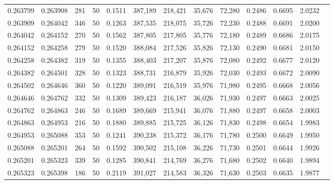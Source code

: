\begin{tabular}{rrrrrrrrrrrrr}
0.263799 & 0.263908 &   281 &  50 &                                     0.1511 & 387,189 & 218,421 &  35,676 &  72,280 & 0.2486 & 0.6695 & 2.0232 \\
0.263909 & 0.264042 &   346 &  50 &                                     0.1263 & 387,535 & 218,075 &  35,726 &  72,230 & 0.2488 & 0.6691 & 2.0200 \\
0.264042 & 0.264152 &   270 &  50 &                                     0.1562 & 387,805 & 217,805 &  35,776 &  72,180 & 0.2489 & 0.6686 & 2.0175 \\
0.264152 & 0.264258 &   279 &  50 &                                     0.1520 & 388,084 & 217,526 &  35,826 &  72,130 & 0.2490 & 0.6681 & 2.0150 \\
0.264258 & 0.264382 &   319 &  50 &                                     0.1355 & 388,403 & 217,207 &  35,876 &  72,080 & 0.2492 & 0.6677 & 2.0120 \\
0.264382 & 0.264501 &   328 &  50 &                                     0.1323 & 388,731 & 216,879 &  35,926 &  72,030 & 0.2493 & 0.6672 & 2.0090 \\
0.264502 & 0.264646 &   360 &  50 &                                     0.1220 & 389,091 & 216,519 &  35,976 &  71,980 & 0.2495 & 0.6668 & 2.0056 \\
0.264646 & 0.264762 &   332 &  50 &                                     0.1309 & 389,423 & 216,187 &  36,026 &  71,930 & 0.2497 & 0.6663 & 2.0025 \\
0.264762 & 0.264863 &   246 &  50 &                                     0.1689 & 389,669 & 215,941 &  36,076 &  71,880 & 0.2497 & 0.6658 & 2.0003 \\
0.264863 & 0.264953 &   216 &  50 &                                     0.1880 & 389,885 & 215,725 &  36,126 &  71,830 & 0.2498 & 0.6654 & 1.9983 \\
0.264953 & 0.265088 &   353 &  50 &                                     0.1241 & 390,238 & 215,372 &  36,176 &  71,780 & 0.2500 & 0.6649 & 1.9950 \\
0.265088 & 0.265201 &   264 &  50 &                                     0.1592 & 390,502 & 215,108 &  36,226 &  71,730 & 0.2501 & 0.6644 & 1.9926 \\
0.265201 & 0.265323 &   339 &  50 &                                     0.1285 & 390,841 & 214,769 &  36,276 &  71,680 & 0.2502 & 0.6640 & 1.9894 \\
0.265323 & 0.265398 &   186 &  50 &                                     0.2119 & 391,027 & 214,583 &  36,326 &  71,630 & 0.2503 & 0.6635 & 1.9877 \\

\end{tabular}
